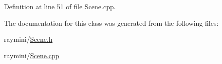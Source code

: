 Definition at line 51 of file Scene.cpp.



The documentation for this class was generated from the following files:\begin{DoxyCompactItemize}
\item 
raymini/\hyperlink{_scene_8h}{Scene.h}\item 
raymini/\hyperlink{_scene_8cpp}{Scene.cpp}\end{DoxyCompactItemize}
